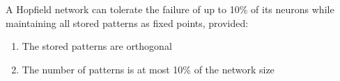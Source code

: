 \begin{definition}\label{fault_tolerance_bound}
\leanok
A Hopfield network can tolerate the failure of up to 10\% of its neurons
    while maintaining all stored patterns as fixed points, provided:
\begin{enumerate}
\item The stored patterns are orthogonal
\item The number of patterns is at most 10\% of the network size
\end{enumerate}
\end{definition}
